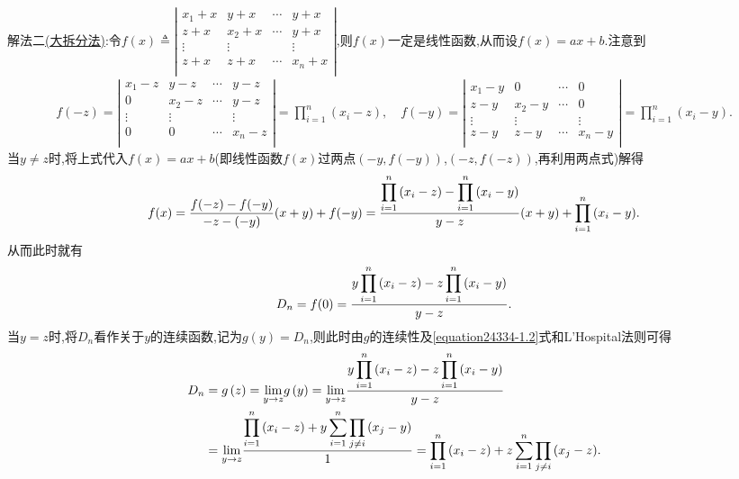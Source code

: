 \documentclass[../../main.tex]{subfiles}%
\begin{document}
\begin{solution}
{\color{blue}解法二\hyperref[大拆分法]{(大拆分法)}:}令$f(x) \triangleq \left| \begin{matrix}
x_1+x & y+x & \cdots & y+x \\
z+x & x_2+x & \cdots & y+x \\
\vdots & \vdots & & \vdots \\
z+x & z+x & \cdots & x_n+x \\
\end{matrix} \right|$,则$f(x)$一定是线性函数,从而设$f(x) =ax+b$.注意到
\begin{align*}
f(-z) =\left| \begin{matrix}
x_1-z & y-z & \cdots & y-z \\
0 & x_2-z & \cdots & y-z \\
\vdots & \vdots & & \vdots \\
0 & 0 & \cdots & x_n-z \\
\end{matrix} \right|=\prod_{i=1}^n{(x_i-z)},\quad f(-y) =\left| \begin{matrix}
x_1-y & 0 & \cdots & 0 \\
z-y & x_2-y & \cdots & 0 \\
\vdots & \vdots & & \vdots \\
z-y & z-y & \cdots & x_n-y \\
\end{matrix} \right|=\prod_{i=1}^n{(x_i-y)}.
\end{align*}
当$y\ne z$时,将上式代入$f(x) =ax+b$(即线性函数$f(x)$过两点$(-y,f(-y))$,$(-z,f(-z))$,再利用两点式)解得
\begin{align*}
f(x) =\frac{\displaystyle f(-z) -f(-y)}{\displaystyle -z-(-y)}(x+y) +f(-y) =\frac{\displaystyle \prod_{i=1}^n{(x_i-z)}-\prod_{i=1}^n{(x_i-y)}}{\displaystyle y-z}(x+y) +\prod_{i=1}^n{(x_i-y)}.
\end{align*}
从而此时就有
\begin{align}
D_n=f(0) =\frac{\displaystyle y\prod_{i=1}^n{(x_i}-z)-z\prod_{i=1}^n{(x_i}-y)}{\displaystyle y-z}.\label{equation24334-1.2}
\end{align}
当$y=z$时,将$D_n$看作关于$y$的连续函数,记为$g(y) =D_n$,则此时由$g$的连续性及\eqref{equation24334-1.2}式和L'Hospital法则可得
\begin{align*}
D_n&=g\left( z \right) =\underset{y\rightarrow z}{\lim}g\left( y \right) =\underset{y\rightarrow z}{\lim}\frac{\displaystyle y\prod_{i=1}^n{(x_i}-z)-z\prod_{i=1}^n{(x_i}-y)}{\displaystyle y-z}
\\
&=\underset{y\rightarrow z}{\lim}\frac{\displaystyle \prod_{i=1}^n{(x_i}-z)+y\sum_{i=1}^n{\prod_{j\ne i}{(x_j}}-y)}{\displaystyle 1}=\prod_{i=1}^n{(x_i}-z)+z\sum_{i=1}^n{\prod_{j\ne i}{(x_j}}-z).
\end{align*}

\end{solution}
\end{document}
